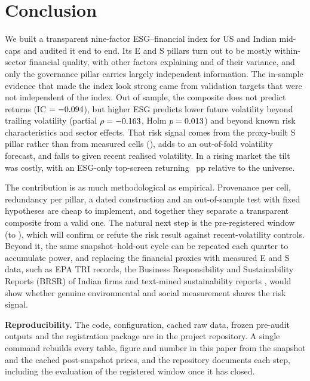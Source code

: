 \section{Conclusion}
\label{sec:conclusion}

We built a transparent nine-factor ESG--financial index for \NMid US and
Indian mid-caps and audited it end to end. Its E and S pillars turn out to
be mostly within-sector financial quality, with other factors explaining
\RSqE and \RSqS of their variance, and only the governance pillar carries
largely independent information. The in-sample evidence that made the index
look strong came from validation targets that were not independent of the
index. Out of sample, the composite does not predict returns
(IC $=-0.094$), but higher ESG predicts lower future volatility beyond
trailing volatility (partial $\rho=-0.163$, Holm $p=0.013$) and beyond
\NControls known risk characteristics and sector effects. That risk signal
comes from the proxy-built S pillar rather than from measured cells
(\PartMeas), adds \CVDeltaESG to an out-of-fold volatility forecast, and
falls to \RecFirst given recent realised volatility. In a rising market the
tilt was costly, with an ESG-only top-\TopN screen returning \ExESGFull~pp
relative to the universe.

The contribution is as much methodological as empirical. Provenance per
cell, redundancy per pillar, a dated construction and an out-of-sample test
with fixed hypotheses are cheap to implement, and together they separate a
transparent composite from a valid one. The natural next step is the
pre-registered window (\PreregAnchor to \PreregEnd), which will confirm or
refute the risk result against recent-volatility controls. Beyond it, the
same snapshot--hold-out cycle can be repeated each quarter to accumulate
power, and replacing the financial proxies with measured E and S data, such
as EPA TRI records, the Business Responsibility and Sustainability Reports
(BRSR) of Indian firms and text-mined sustainability reports
\cite{luccioni_2020}, would show whether genuine environmental and social
measurement shares the risk signal.

\textbf{Reproducibility.} The code, configuration, cached raw data, frozen
pre-audit outputs and the registration package are in the project
repository\RepoNote. A single command rebuilds every table, figure and
number in this paper from the \SnapshotDate snapshot and the cached
post-snapshot prices, and the repository documents each step, including the
evaluation of the registered window once it has closed.
